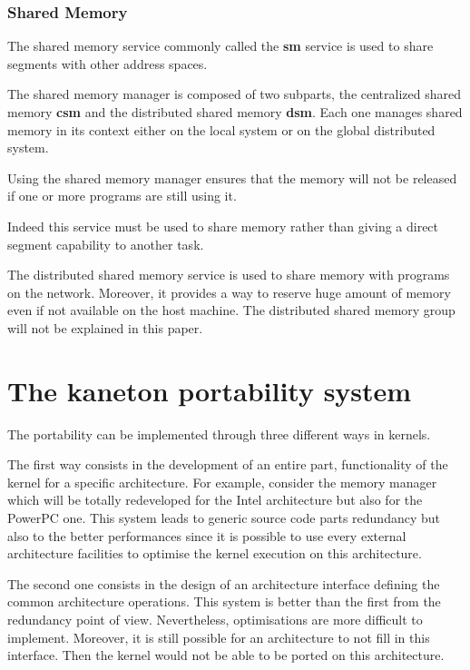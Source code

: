 \begin{multicols}{2}
\subsubsection{Shared Memory}

The shared memory service commonly called the \textbf{sm} service is used
to share segments with other address spaces.

The shared memory manager is composed of two subparts, the centralized
shared memory \textbf{csm} and the distributed shared memory \textbf{dsm}.
Each one manages shared memory in its context either on the local system
or on the global distributed system.

Using the shared memory manager ensures that the memory will not be released
if one or more programs are still using it.

Indeed this service must be used to share memory rather than giving
a direct segment capability to another task.

The distributed shared memory service is used to share memory with
programs on the network. Moreover, it provides a way to reserve huge amount
of memory even if not available on the host machine. The distributed shared
memory group will not be explained in this paper.

%
%

\section{The kaneton portability system}

The portability can be implemented through three different ways in kernels.

The first way consists in the development of an entire part, functionality
of the kernel for a specific architecture. For example, consider the
memory manager which will be totally redeveloped for the Intel architecture
but also for the PowerPC one. This system leads to generic source code parts
redundancy but also to the better performances since it is possible
to use every external architecture facilities to optimise the kernel
execution on this architecture.

The second one consists in the design of an architecture interface defining
the common architecture operations. This system is better than the first
from the redundancy point of view. Nevertheless, optimisations are more
difficult to implement. Moreover, it is still possible for an architecture
to not fill in this interface. Then the kernel would not be able to be
ported on this architecture.


\end{multicols}
